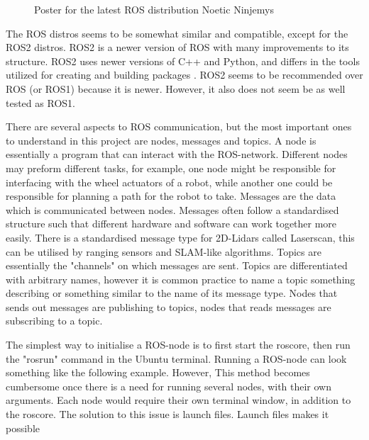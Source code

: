 \begin{figure}[H]
\centering

  \caption{Poster for the latest ROS distribution Noetic Ninjemys \cite{ROSLogo}}
  \label{fig:noeticLogo}
\end{figure}

The ROS distros seems to be somewhat similar and compatible, except for the ROS2 distros. ROS2 is a newer version of ROS with many improvements to its structure. ROS2 uses newer versions of C++ and Python, and differs in the tools utilized for creating and building packages \cite{ROSChanges}. ROS2 seems to be recommended over ROS (or ROS1) because it is newer. However, it also does not seem be as well tested as ROS1.

There are several aspects to ROS communication, but the most important ones to understand in this project are nodes, messages and topics. A node is essentially a program that can interact with the ROS-network. Different nodes may preform different tasks, for example, one node might be responsible for interfacing with the wheel actuators of a robot, while another one could be responsible for planning a path for the robot to take. Messages are the data which is communicated between nodes. Messages often follow a standardised structure such that different hardware and software can work together more easily. There is a standardised message type for 2D-Lidars called Laserscan, this can be utilised by ranging sensors and SLAM-like algorithms.  Topics are essentially the "channels" on which messages are sent. Topics are differentiated with arbitrary names, however it is common practice to name a topic something describing or something similar to the name of its message type. Nodes that sends out messages are publishing to topics, nodes that reads messages are subscribing to a topic. 

The simplest way to initialise a ROS-node is to first start the roscore, then run the "rosrun" command in the Ubuntu terminal. Running a ROS-node can look something like the following example.  
However, This method becomes cumbersome once there is a need for running several nodes, with their own arguments. Each node would require their own terminal window, in addition to the roscore. The solution to this issue is launch files. Launch files makes it possible 
